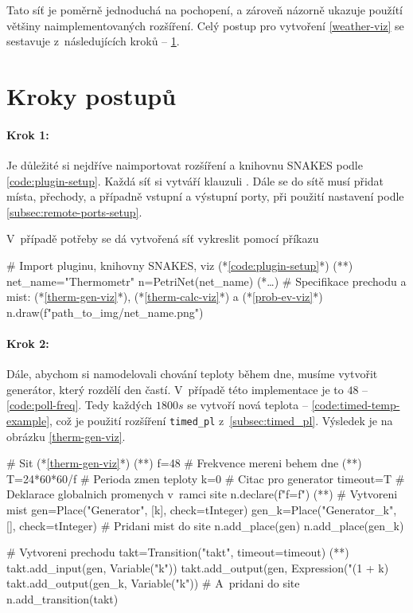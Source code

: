 Tato síť je poměrně jednoduchá na pochopení, a zároveň názorně ukazuje použítí většiny naimplementovaných rozšíření. Celý postup pro vytvoření \ref{weather-viz} se sestavuje z~následujících kroků -- \ref{sec:process-steps}.

\section{Kroky postupů}
\label{sec:process-steps}

\paragraph{Krok 1:}

Je důležité si nejdříve naimportovat rozšíření a knihovnu SNAKES podle \ref{code:plugin-setup}. Každá síť si vytváří klauzuli . Dále se do sítě musí přidat místa, přechody, a případně vstupní a výstupní porty, při použití nastavení podle \ref{subsec:remote-ports-setup}.

V~případě potřeby se dá vytvořená síť vykreslit pomocí příkazu 

\begin{python}
 # Import pluginu, knihovny SNAKES, viz (*\ref{code:plugin-setup}*) (*\label{code:thermometr-draw}*)
 net_name="Thermometr"
 n=PetriNet(net_name)
 (*\ldots*) # Specifikace prechodu a mist: (*\ref{therm-gen-viz}*), (*\ref{therm-calc-viz}*) a (*\ref{prob-ev-viz}*)
 n.draw(f"{path_to_img}/{net_name}.png")
\end{python}

\paragraph{Krok 2:}

Dále, abychom si namodelovali chování teploty během dne, musíme vytvořit generátor, který rozdělí den častí. V~případě této implementace je to $48$ -- \ref{code:poll-freq}. Tedy každých $1800s$ se vytvoří nová teplota -- \ref{code:timed-temp-example}, což je použití rozšíření \texttt{timed\_pl} z~\ref{subsec:timed_pl}. Výsledek je na obrázku \ref{therm-gen-viz}.

\begin{python}
 # Sit (*\ref{therm-gen-viz}*) (*\label{code:gen-therm-draw}*)
 f=48 # Frekvence mereni behem dne (*\label{code:poll-freq}*)
 T=24*60*60/f # Perioda zmen teploty
 k=0 # Citac pro generator
 timeout=T
  # Deklarace globalnich promenych v~ramci site
 n.declare(f"f={f}") (*\label{code:snakes-glob-var}*)
  # Vytvoreni mist
 gen=Place("Generator", [k], check=tInteger)
 gen_k=Place("Generator_k", [], check=tInteger)
 # Pridani mist do site
 n.add_place(gen)
 n.add_place(gen_k)

 # Vytvoreni prechodu
 takt=Transition("takt", timeout=timeout) (*\label{code:timed-temp-example}*)
 takt.add_input(gen, Variable("k"))
 takt.add_output(gen, Expression("(1 + k) %
 takt.add_output(gen_k, Variable("k"))
 # A~pridani do site
 n.add_transition(takt)
\end{python}

